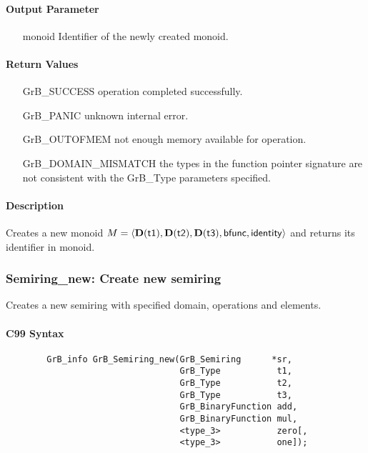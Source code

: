 \paragraph{Output Parameter}

\begin{itemize}[leftmargin=1.1in]
    \item[{\sf monoid}] Identifier of the newly created monoid.
\end{itemize}

\paragraph{Return Values}

\begin{itemize}[leftmargin=2.1in]
\item[{\sf GrB\_SUCCESS}]           operation completed successfully.
\item[{\sf GrB\_PANIC}]             unknown internal error.
\item[{\sf GrB\_OUTOFMEM}]          not enough memory available for operation.
\item[{\sf GrB\_DOMAIN\_MISMATCH}]  the types in the function pointer signature are not   
                                    consistent with the {\sf GrB\_Type} parameters specified.
\end{itemize}

\paragraph{Description}

Creates a new monoid $M = \langle \bold{D}({\sf t1}), \bold{D}({\sf t2}), 
\bold{D}({\sf t3}), {\sf bfunc}, {\sf identity} \rangle$ and
returns its identifier in {\sf monoid}.


\subsubsection{{\sf Semiring\_new}: Create new semiring}

Creates a new semiring with specified domain, operations and elements.

\paragraph{C99 Syntax}

\begin{verbatim}
        GrB_info GrB_Semiring_new(GrB_Semiring      *sr,
                                  GrB_Type           t1,
                                  GrB_Type           t2,
                                  GrB_Type           t3,
                                  GrB_BinaryFunction add,
                                  GrB_BinaryFunction mul,
                                  <type_3>           zero[,
                                  <type_3>           one]);
\end{verbatim}

